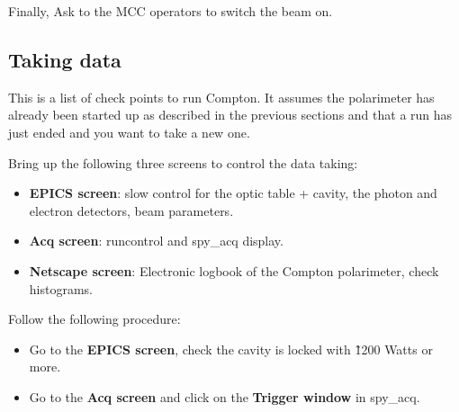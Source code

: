{{\begin{itemize}
Finally, Ask to the MCC operators to switch the beam on.
\end{itemize}

\subsection{Taking data}
This is a list of check points to run Compton. It assumes the polarimeter 
has already been started up as described in the previous sections and  
that a run has just ended and you want to take a 
new one.

Bring up the  following three screens to control the data taking:

\begin{itemize}
\item {\bf EPICS screen}: slow control for the optic table + cavity, the 
photon and electron detectors, beam parameters.
\item {\bf Acq screen}: runcontrol and spy\_acq display.
\item {\bf Netscape screen}: Electronic logbook of the Compton polarimeter, 
check histograms.
 \end{itemize}

Follow the following procedure:
\begin{itemize}
\item Go to the {\bf EPICS screen}, check the cavity is locked with \~1200 Watts 
or more.
\item Go to the {\bf Acq screen} and click on the {\bf Trigger window} in spy\_acq. 
   

\end{itemize}}}
